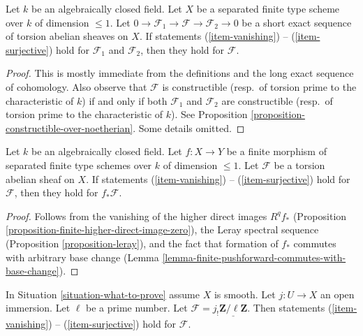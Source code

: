 \begin{lemma}
\label{lemma-ses-statements}
Let $k$ be an algebraically closed field. Let $X$ be a separated finite
type scheme over $k$ of dimension $\leq 1$. Let
$0 \to \mathcal{F}_1 \to \mathcal{F} \to \mathcal{F}_2 \to 0$
be a short exact sequence of torsion abelian sheaves on $X$.
If statements (\ref{item-vanishing}) -- (\ref{item-surjective}) hold
for $\mathcal{F}_1$ and $\mathcal{F}_2$, then they hold
for $\mathcal{F}$.
\end{lemma}

\begin{proof}
This is mostly immediate from the definitions and the long exact sequence
of cohomology. Also observe that $\mathcal{F}$ is constructible
(resp.\ of torsion prime to the characteristic of $k$) if and only if
both $\mathcal{F}_1$ and $\mathcal{F}_2$ are constructible
(resp.\ of torsion prime to the characteristic of $k$). See
Proposition \ref{proposition-constructible-over-noetherian}.
Some details omitted.
\end{proof}

\begin{lemma}
\label{lemma-finite-pushforward-statements}
Let $k$ be an algebraically closed field. Let $f : X \to Y$ be a
finite morphism of separated finite type schemes over $k$ of
dimension $\leq 1$. Let $\mathcal{F}$ be a torsion abelian sheaf on $X$.
If statements (\ref{item-vanishing}) -- (\ref{item-surjective}) hold
for $\mathcal{F}$, then they hold for $f_*\mathcal{F}$.
\end{lemma}

\begin{proof}
Follows from the vanishing of the higher direct images $R^qf_*$
(Proposition \ref{proposition-finite-higher-direct-image-zero}),
the Leray spectral sequence  (Proposition \ref{proposition-leray}),
and the fact that formation of $f_*$ commutes with arbitrary base change
(Lemma \ref{lemma-finite-pushforward-commutes-with-base-change}).
\end{proof}

\begin{lemma}
\label{lemma-even-easier}
In Situation \ref{situation-what-to-prove} assume $X$ is smooth.
Let $j : U \to X$ an open immersion. Let $\ell$ be a prime number.
Let $\mathcal{F} = j_!\underline{\mathbf{Z}/\ell\mathbf{Z}}$.
Then statements (\ref{item-vanishing}) -- (\ref{item-surjective}) hold
for $\mathcal{F}$.
\end{lemma}

